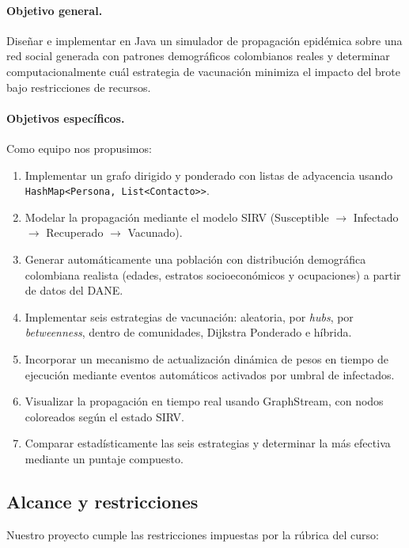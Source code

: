 \documentclass[spanish,notitlepage,letterpaper, 12pt]{article}
\begin{document}
\paragraph{Objetivo general.} Dise\~nar e implementar en Java un simulador de propagaci\'on epid\'emica sobre una red social generada con patrones demogr\'aficos colombianos reales y determinar computacionalmente cu\'al estrategia de vacunaci\'on minimiza el impacto del brote bajo restricciones de recursos.

\paragraph{Objetivos espec\'ificos.} Como equipo nos propusimos:
\begin{enumerate}[label=\arabic*.]
    \item Implementar un grafo dirigido y ponderado con listas de adyacencia usando \texttt{HashMap<Persona, List<Contacto>{}>}.
    \item Modelar la propagaci\'on mediante el modelo SIRV (Susceptible $\rightarrow$ Infectado $\rightarrow$ Recuperado $\rightarrow$ Vacunado).
    \item Generar autom\'aticamente una poblaci\'on con distribuci\'on demogr\'afica colombiana realista (edades, estratos socioecon\'omicos y ocupaciones) a partir de datos del DANE.
    \item Implementar seis estrategias de vacunaci\'on: aleatoria, por \textit{hubs}, por \textit{betweenness}, dentro de comunidades, Dijkstra Ponderado e h\'ibrida.
    \item Incorporar un mecanismo de actualizaci\'on din\'amica de pesos en tiempo de ejecuci\'on mediante eventos autom\'aticos activados por umbral de infectados.
    \item Visualizar la propagaci\'on en tiempo real usando GraphStream, con nodos coloreados seg\'un el estado SIRV.
    \item Comparar estad\'isticamente las seis estrategias y determinar la m\'as efectiva mediante un puntaje compuesto.
\end{enumerate}


\subsection{Alcance y restricciones}

Nuestro proyecto cumple las restricciones impuestas por la r\'ubrica del curso:
\end{document}
